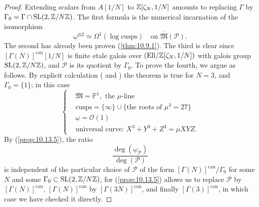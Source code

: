 \begin{proof}
Extending scalars from $A[1/N]$ to $\mathbb{Z}[\zeta_N, 1/N]$ amounts to replacing $\Gamma$ by $\Gamma_0 = \Gamma \cap \operatorname{SL}(2, \mathbb{Z}/N\mathbb{Z})$. The first formula is the numerical incarnation of the isomorphism
\[
\underline{\omega}^{\otimes 2} \simeq \Omega^1(\log\mathrm{cusps}) \quad\text{on } \overline{\mathfrak{M}}(\mathcal{P}) .
\]
The second has already been proven (\ref{thm:10.9.1}). The third is clear since $[\Gamma(N)]^{\mathrm{can}}[1/N]$ is finite etale galois over $(\mathrm{Ell}/\mathbb{Z}[\zeta_N, 1/N])$ with galois group $\operatorname{SL}(2, \mathbb{Z}/N\mathbb{Z})$, and $\mathcal{P}$ is its quotient by $\Gamma_0$. To prove the fourth, we argue as follows. By explicit calculation (\cite{Ig2} and \cite[AI, 5.5]{K2}) the theorem is true for $N = 3$, and $\Gamma_0 = \{1\}$; in this case
\[
\left\{
\begin{aligned}
&\overline{\mathfrak{M}} = \mathbb{P}^1, \text{ the } \mu\text{-line} \\
&\text{cusps} = \{\infty\} \cup \{\text{the roots of } \mu^3 = 27\} \\
&\underline{\omega} = \mathcal{O}(1) \\
&\text{universal curve: } X^3 + Y^3 + Z^3 = \mu XYZ .
\end{aligned}
\right.
\]
By (\ref{prop:10.13.5}), the ratio
\[
\frac{\deg(\underline{\omega}_{\mathcal{P}})}{\deg(\mathcal{P})}
\]
is independent of the particular choice of $\mathcal{P}$ of the form $[\Gamma(N)]^{\mathrm{can}}/\Gamma_0$ for some $N$ and some $\Gamma_0 \subset \operatorname{SL}(2, \mathbb{Z}/N\mathbb{Z})$, for (\ref{prop:10.13.5}) allows us to replace $\mathcal{P}$ by $[\Gamma(N)]^{\mathrm{can}}$, $[\Gamma(N)]^{\mathrm{can}}$ by $[\Gamma(3N)]^{\mathrm{can}}$, and finally $[\Gamma(3)]^{\mathrm{can}}$, in which case we have checked it directly.
\end{proof}
